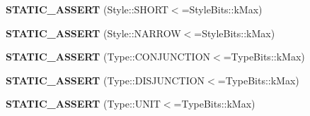 \begin{DoxyCompactItemize}
{\bfseries S\+T\+A\+T\+I\+C\+\_\+\+A\+S\+S\+E\+RT} (Style\+::\+S\+H\+O\+RT$<$=Style\+Bits\+::k\+Max)
\item 
\mbox{\label{classv8_1_1internal_1_1JSListFormat_a9653911012e03f5034d9440fe7484233}} 
{\bfseries S\+T\+A\+T\+I\+C\+\_\+\+A\+S\+S\+E\+RT} (Style\+::\+N\+A\+R\+R\+OW$<$=Style\+Bits\+::k\+Max)
\item 
\mbox{\label{classv8_1_1internal_1_1JSListFormat_a547a1af9970a5b60e63555014f2f9016}} 
{\bfseries S\+T\+A\+T\+I\+C\+\_\+\+A\+S\+S\+E\+RT} (Type\+::\+C\+O\+N\+J\+U\+N\+C\+T\+I\+ON$<$=Type\+Bits\+::k\+Max)
\item 
\mbox{\label{classv8_1_1internal_1_1JSListFormat_a535fe960b3d5cc05a2f32208d88e1988}} 
{\bfseries S\+T\+A\+T\+I\+C\+\_\+\+A\+S\+S\+E\+RT} (Type\+::\+D\+I\+S\+J\+U\+N\+C\+T\+I\+ON$<$=Type\+Bits\+::k\+Max)
\item 
\mbox{\label{classv8_1_1internal_1_1JSListFormat_ae8cb2230eaf364f5e08a1962d3b898e0}} 
{\bfseries S\+T\+A\+T\+I\+C\+\_\+\+A\+S\+S\+E\+RT} (Type\+::\+U\+N\+IT$<$=Type\+Bits\+::k\+Max)
\end{DoxyCompactItemize}
